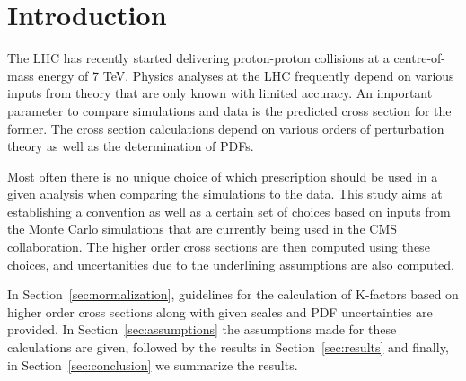 \section{Introduction}
\label{sec:intro}
The LHC has recently started delivering proton-proton collisions at a centre-of-mass energy of 7 TeV. 
Physics analyses at the LHC frequently depend on various inputs from theory that are only known with
limited accuracy. An important parameter to compare simulations and data is the predicted cross section for the former. The cross section calculations depend on various orders of perturbation theory
as well as the determination of PDFs. 

Most often there is no unique choice of which prescription should be used in 
a given analysis when comparing the simulations to the data. This study aims at establishing a convention as well 
as a certain set of choices based on inputs from the Monte Carlo simulations that are currently being used in the 
CMS collaboration. The higher order cross sections are then computed using these choices, and  
uncertanities due to the underlining assumptions are also computed.

In Section~\ref{sec:normalization}, guidelines for the calculation of K-factors based on higher order cross sections
along with given scales and PDF uncertainties are provided. In Section~\ref{sec:assumptions}
the assumptions made for these calculations are given, followed by the results in Section~\ref{sec:results}
and finally, in Section~\ref{sec:conclusion} we summarize the results.  
